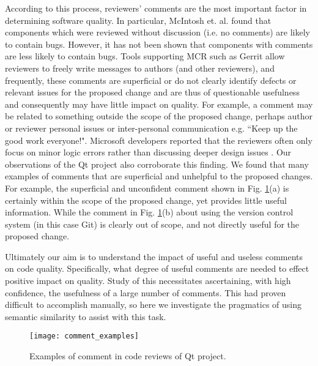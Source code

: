 According to this process, reviewers' comments are the most important factor in determining software quality.
In particular, McIntosh et. al. \cite{Mcintosh} found that components which were reviewed without discussion (i.e. no comments) are likely to contain bugs.
However, it has not been shown that components with comments are less likely to contain bugs. Tools supporting MCR such as Gerrit allow reviewers to freely write messages to authors (and other reviewers), and frequently, these comments are superficial or do not clearly identify defects or relevant issues for the proposed change and are thus of questionable usefulness and consequently may have little impact on quality.
For example, a comment may be related to something outside the scope of the proposed change, perhaps author or reviewer personal issues or inter-personal communication e.g. ``Keep up the good work everyone!".
Microsoft developers reported that the reviewers often only focus on minor logic errors rather than discussing deeper design issues \cite{Bacchelli2013a}.
Our observations of the Qt project also corroborate this finding.
We found that many examples of comments that are superficial and unhelpful to the proposed changes.
For example, the superficial and unconfident comment shown in Fig. \ref{fig:example}(a) is certainly within the scope of the proposed change, yet provides little useful information.
While the comment in Fig. \ref{fig:example}(b) about using the version control system (in this case Git) is clearly out of scope, and not directly useful for the proposed change. 

Ultimately our aim is to understand the impact of useful and useless comments on code quality. Specifically, what degree of useful comments are needed to effect positive impact on quality. Study of this necessitates ascertaining, with high confidence, the usefulness of a large number of comments. This  had proven difficult to accomplish manually, so here we investigate the pragmatics of using semantic similarity to assist with this task.


\begin{figure}[!t]
\centering
\texttt{[image: comment\_examples]}
\caption{Examples of comment in code reviews of Qt project.}
\label{fig:example}
\end{figure}
